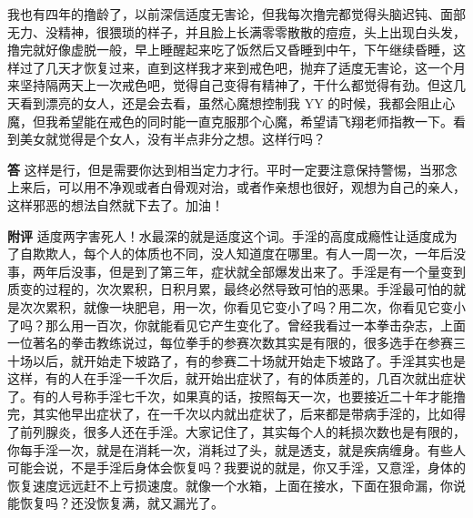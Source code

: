 \begin{case}
    我也有四年的撸龄了，以前深信适度无害论，但我每次撸完都觉得头脑迟钝、面部无力、没精神，很猥琐的样子，并且脸上长满零零散散的痘痘，头上出现白头发，撸完就好像虚脱一般，早上睡醒起来吃了饭然后又昏睡到中午，下午继续昏睡，这样过了几天才恢复过来，直到这样我才来到戒色吧，抛弃了适度无害论，这一个月来坚持隔两天上一次戒色吧，觉得自己变得有精神了，干什么都觉得有劲。但这几天看到漂亮的女人，还是会去看，虽然心魔想控制我 YY 的时候，我都会阻止心魔，但我希望能在戒色的同时能一直克服那个心魔，希望请飞翔老师指教一下。看到美女就觉得是个女人，没有半点非分之想。这样行吗？

    \textbf{答} 这样是行，但是需要你达到相当定力才行。平时一定要注意保持警惕，当邪念上来后，可以用不净观或者白骨观对治，或者作亲想也很好，观想为自己的亲人，这样邪恶的想法自然就下去了。加油！

    \textbf{附评} 适度两字害死人！水最深的就是适度这个词。手淫的高度成瘾性让适度成为了自欺欺人，每个人的体质也不同，没人知道度在哪里。有人一周一次，一年后没事，两年后没事，但是到了第三年，症状就全部爆发出来了。手淫是有一个量变到质变的过程的，次次累积，日积月累，最终必然导致可怕的恶果。手淫最可怕的就是次次累积，就像一块肥皂，用一次，你看见它变小了吗？用二次，你看见它变小了吗？那么用一百次，你就能看见它产生变化了。曾经我看过一本拳击杂志，上面一位著名的拳击教练说过，每位拳手的参赛次数其实是有限的，很多选手在参赛三十场以后，就开始走下坡路了，有的参赛二十场就开始走下坡路了。手淫其实也是这样，有的人在手淫一千次后，就开始出症状了，有的体质差的，几百次就出症状了。有的人号称手淫七千次，如果真的话，按照每天一次，也要接近二十年才能撸完，其实他早出症状了，在一千次以内就出症状了，后来都是带病手淫的，比如得了前列腺炎，很多人还在手淫。大家记住了，其实每个人的耗损次数也是有限的，你每手淫一次，就是在消耗一次，消耗过了头，就是透支，就是疾病缠身。有些人可能会说，不是手淫后身体会恢复吗？我要说的就是，你又手淫，又意淫，身体的恢复速度远远赶不上亏损速度。就像一个水箱，上面在接水，下面在狠命漏，你说能恢复吗？还没恢复满，就又漏光了。


\end{case}
